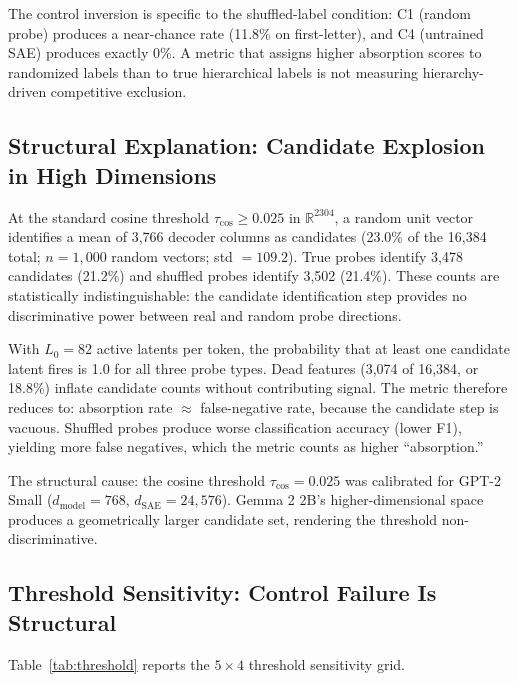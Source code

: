 \documentclass{article}
\begin{document}
The control inversion is specific to the shuffled-label condition: C1 (random probe) produces a near-chance rate (11.8\% on first-letter), and C4 (untrained SAE) produces exactly 0\%. A metric that assigns higher absorption scores to randomized labels than to true hierarchical labels is not measuring hierarchy-driven competitive exclusion.

\subsection{Structural Explanation: Candidate Explosion in High Dimensions}

At the standard cosine threshold $\tau_{\cos} \geq 0.025$ in $\mathbb{R}^{2304}$, a random unit vector identifies a mean of 3,766 decoder columns as candidates (23.0\% of the 16,384 total; $n = 1{,}000$ random vectors; std $= 109.2$). True probes identify 3,478 candidates (21.2\%) and shuffled probes identify 3,502 (21.4\%). These counts are statistically indistinguishable: the candidate identification step provides no discriminative power between real and random probe directions.

With $L_0 = 82$ active latents per token, the probability that at least one candidate latent fires is 1.0 for all three probe types. Dead features (3,074 of 16,384, or 18.8\%) inflate candidate counts without contributing signal. The metric therefore reduces to: absorption rate $\approx$ false-negative rate, because the candidate step is vacuous. Shuffled probes produce worse classification accuracy (lower F1), yielding more false negatives, which the metric counts as higher ``absorption.''

The structural cause: the cosine threshold $\tau_{\cos} = 0.025$ was calibrated for GPT-2 Small ($d_{\text{model}} = 768$, $d_{\text{SAE}} = 24{,}576$). Gemma 2 2B's higher-dimensional space produces a geometrically larger candidate set, rendering the threshold non-discriminative.

\subsection{Threshold Sensitivity: Control Failure Is Structural}

Table~\ref{tab:threshold} reports the $5 \times 4$ threshold sensitivity grid.
\end{document}

